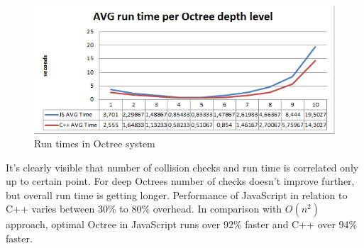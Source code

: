 \begin{figure}[h!]
  \caption{Run times in Octree system}
  \label{img:octree-time}
  \centering
	\includegraphics[width=16cm]{spheres/octree-time.png}
\end{figure}

It's clearly visible that number of collision checks and run time is correlated  only up to certain point. For deep Octrees number of checks doesn't improve further, but overall run time is getting longer. Performance of JavaScript in relation to C++ varies between 30\% to 80\% overhead. In comparison with $O(n^2)$ approach, optimal Octree in JavaScript runs over 92\% faster and C++ over 94\% faster. 
